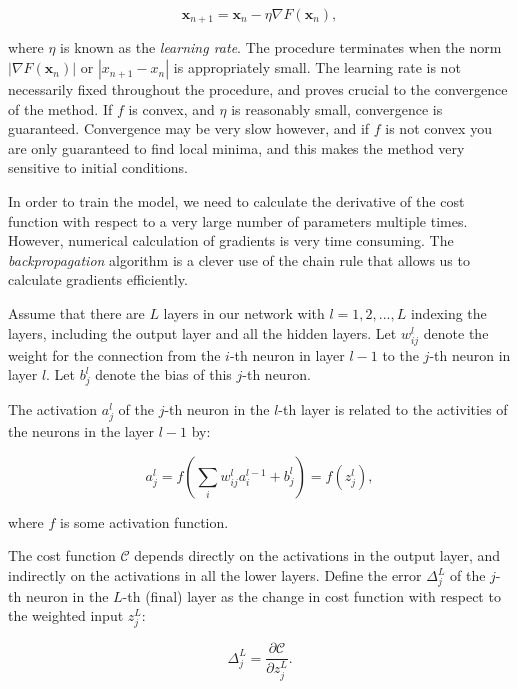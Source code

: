 \begin{equation}
 \bm{x}_{n+1} = \bm{x}_{n} - \eta \nabla F(\bm{x}_n), 
\end{equation}

where $\eta$ is known as the \textit{learning rate}.
The procedure terminates when the norm
$ \left| \nabla F(\bm{x}_n) \right| $ or
$ \left| x_{n+1} - x_{n} \right| $
is appropriately small.
\newline
The learning rate is not necessarily fixed throughout the procedure,
and proves crucial to the convergence of the method. If $f$
is convex, and $\eta$ is reasonably small, convergence is guaranteed.
Convergence may be very slow however, and if $f$ is not convex
you are only guaranteed to find local minima, and this makes
the method very sensitive to initial conditions.
\par
In order to train the model, we need to calculate the derivative of the cost
function with respect to a very large number of parameters multiple times. However,
numerical calculation of gradients is very time consuming. The \textit{backpropagation}
algorithm is a clever use of the chain rule that allows us to calculate gradients efficiently.
\par
Assume that there are $L$ layers in our network with $l = 1,2,...,L$ indexing the layers, including
the output layer and all the hidden layers.
Let $w_{ij}^l$ denote the weight for the connection
from the $i$-th neuron in layer $l - 1$ to the $j$-th neuron in layer $l$. Let $b_{j}^l$ denote the bias of this $j$-th neuron.

The activation $a_{j}^l$ of the $j$-th neuron in the $l$-th layer is related to the activities of the neurons in the layer $l - 1$ by:

\begin{equation}
 a_{j}^l = f \left( \sum_i w_{ij}^l a_i^{l-1} + b_j^l \right) = f \left( z_j^l \right) ,
\end{equation}

where $f$ is some activation function.

The cost function $\mathcal{C}$ depends directly on the activations in the output layer, and indirectly on the activations
in all the lower layers.
Define the error $\Delta_j^L$ of the $j$-th neuron in the $L$-th (final) layer as the change in cost function
with respect to the weighted input $z_j^L$:

\begin{equation}
 \Delta_j^L = \frac{\partial \mathcal{C}}{\partial z_j^L} .
\end{equation}

